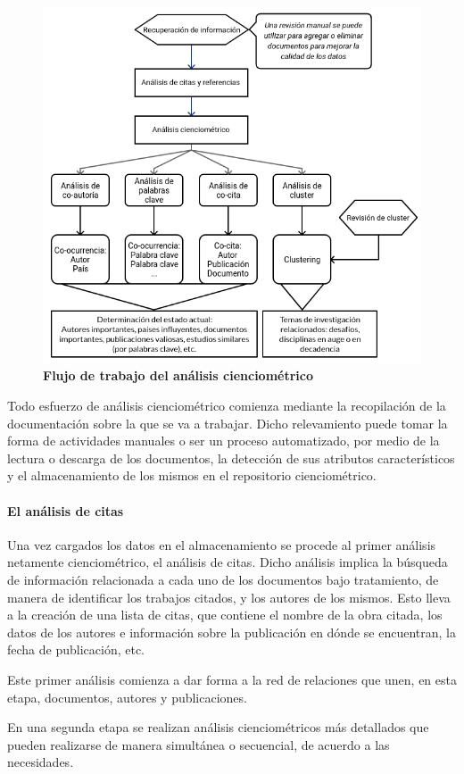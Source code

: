 \begin{figure}[!h]
	\centering
	\includegraphics[width=0.65\linewidth]{images/flow}
	\caption{\textbf{Flujo de trabajo del análisis cienciométrico}}
	\label{fig:flow}
\end{figure}

Todo esfuerzo de análisis cienciométrico comienza mediante la recopilación de la documentación sobre la que se va a trabajar. Dicho relevamiento puede tomar la forma de actividades manuales o ser un proceso automatizado, por medio de la lectura o descarga de los documentos, la detección de sus atributos característicos y el almacenamiento de los mismos en el repositorio cienciométrico.

\paragraph{El análisis de citas}
Una vez cargados los datos en el almacenamiento se procede al primer análisis netamente cienciométrico, el análisis de citas. Dicho análisis implica la búsqueda de información relacionada a cada uno de los documentos bajo tratamiento, de manera de identificar los trabajos citados, y los autores de los mismos. Esto lleva a la creación de una lista de citas, que contiene el nombre de la obra citada, los datos de los autores e información sobre la publicación en dónde se encuentran, la fecha de publicación, etc.

Este primer análisis comienza a dar forma a la red de relaciones que unen, en esta etapa, documentos, autores y publicaciones.

En una segunda etapa se realizan análisis cienciométricos más detallados que pueden realizarse de manera simultánea o secuencial, de acuerdo a las necesidades.

